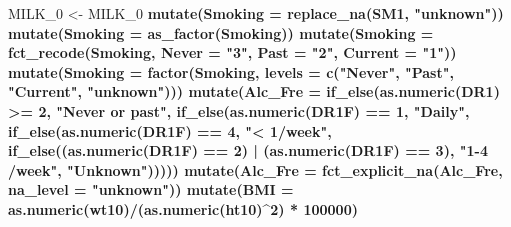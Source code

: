 \documentclass[]{article}
\newenvironment{Shaded}{\begin{snugshade}}{\end{snugshade}}
\newcommand{\CommentTok}[1]{\textcolor[rgb]{0.56,0.35,0.01}{\textit{#1}}}
\newcommand{\DataTypeTok}[1]{\textcolor[rgb]{0.13,0.29,0.53}{#1}}
\newcommand{\DecValTok}[1]{\textcolor[rgb]{0.00,0.00,0.81}{#1}}
\newcommand{\KeywordTok}[1]{\textcolor[rgb]{0.13,0.29,0.53}{\textbf{#1}}}
\newcommand{\NormalTok}[1]{#1}
\newcommand{\OperatorTok}[1]{\textcolor[rgb]{0.81,0.36,0.00}{\textbf{#1}}}
\newcommand{\StringTok}[1]{\textcolor[rgb]{0.31,0.60,0.02}{#1}}
\begin{document}
\begin{Shaded}
\begin{Highlighting}[]
\NormalTok{MILK_}\DecValTok{0}\NormalTok{ <-}\StringTok{  }\NormalTok{MILK_}\DecValTok{0} \OperatorTok{%
\StringTok{  }\KeywordTok{mutate}\NormalTok{(}\DataTypeTok{Smoking =} \KeywordTok{replace_na}\NormalTok{(SM1, }\StringTok{"unknown"}\NormalTok{)) }\OperatorTok{%
\StringTok{  }\KeywordTok{mutate}\NormalTok{(}\DataTypeTok{Smoking =} \KeywordTok{as_factor}\NormalTok{(Smoking)) }\OperatorTok{%
\StringTok{  }\KeywordTok{mutate}\NormalTok{(}\DataTypeTok{Smoking =} \KeywordTok{fct_recode}\NormalTok{(Smoking, }\DataTypeTok{Never =} \StringTok{"3"}\NormalTok{, }\DataTypeTok{Past =} \StringTok{"2"}\NormalTok{, }\DataTypeTok{Current =} \StringTok{"1"}\NormalTok{)) }\OperatorTok{%
\StringTok{  }\KeywordTok{mutate}\NormalTok{(}\DataTypeTok{Smoking =} \KeywordTok{factor}\NormalTok{(Smoking, }\DataTypeTok{levels =} \KeywordTok{c}\NormalTok{(}\StringTok{"Never"}\NormalTok{, }\StringTok{"Past"}\NormalTok{, }\StringTok{"Current"}\NormalTok{, }\StringTok{"unknown"}\NormalTok{))) }\OperatorTok{%
\StringTok{  }\KeywordTok{mutate}\NormalTok{(}\DataTypeTok{Alc_Fre =} \KeywordTok{if_else}\NormalTok{(}\KeywordTok{as.numeric}\NormalTok{(DR1) }\OperatorTok{>=}\StringTok{ }\DecValTok{2}\NormalTok{, }\StringTok{"Never or past"}\NormalTok{, }
                           \KeywordTok{if_else}\NormalTok{(}\KeywordTok{as.numeric}\NormalTok{(DR1F) }\OperatorTok{==}\StringTok{ }\DecValTok{1}\NormalTok{, }\StringTok{"Daily"}\NormalTok{, }
                                   \KeywordTok{if_else}\NormalTok{(}\KeywordTok{as.numeric}\NormalTok{(DR1F) }\OperatorTok{==}\StringTok{ }\DecValTok{4}\NormalTok{, }\StringTok{"< 1/week"}\NormalTok{, }
                                           \KeywordTok{if_else}\NormalTok{((}\KeywordTok{as.numeric}\NormalTok{(DR1F) }\OperatorTok{==}\StringTok{ }\DecValTok{2}\NormalTok{) }\OperatorTok{|}\StringTok{ }\NormalTok{(}\KeywordTok{as.numeric}\NormalTok{(DR1F) }\OperatorTok{==}\StringTok{ }\DecValTok{3}\NormalTok{), }
                                                   \StringTok{"1-4 /week"}\NormalTok{, }\StringTok{"Unknown"}\NormalTok{))))) }\OperatorTok{%
\StringTok{  }\KeywordTok{mutate}\NormalTok{(}\DataTypeTok{Alc_Fre =} \KeywordTok{fct_explicit_na}\NormalTok{(Alc_Fre, }\DataTypeTok{na_level =} \StringTok{"unknown"}\NormalTok{)) }\OperatorTok{%
\StringTok{  }\KeywordTok{mutate}\NormalTok{(}\DataTypeTok{BMI =} \KeywordTok{as.numeric}\NormalTok{(wt10)}\OperatorTok{/}\NormalTok{(}\KeywordTok{as.numeric}\NormalTok{(ht10)}\OperatorTok{^}\DecValTok{2}\NormalTok{) }\OperatorTok{*}\StringTok{ }\DecValTok{100000}\NormalTok{) }\OperatorTok{%
}}}}}}}}
\end{Highlighting}
\end{Shaded}
\end{document}
